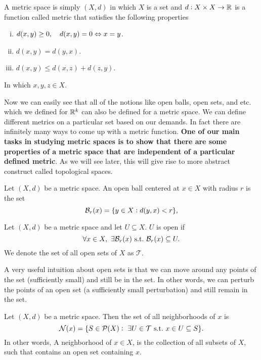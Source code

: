 \begin{definition}
	A metric space is simply $(X,d)$ in which $X$ is a  set and $d:X\times X \to \mathbb{R}$ is a function called metric that satisfies the following properties
	
	\begin{enumerate}[(i)]
		\item $d(x,y) \geq 0,\quad d(x,y) =0 \Leftrightarrow x=y$.
		\item $d(x,y) = d(y,x)$.
		\item $d(x,y) \leq d(x,z) + d(z,y)$.
	\end{enumerate}
	In which $x,y,z\in X$. 
\end{definition}
Now we can easily see that all of the notions like open balls, open sets, and etc. which we defined for $\mathbb{R}^k$ can also be defined for a metric space. We can define different metrics on a particular set based on our demands. In fact there are infinitely many ways to come up with a metric function. \textbf{One of our main tasks in studying metric spaces is to show that there are some properties of a metric space that are independent of a particular defined metric}. As we will see later, this will give rise to more abstract construct called topological spaces. 

\begin{definition}
	Let $(X,d)$ be a metric space. An open ball centered at $x\in X$ with radius $r$ is the set
	\[ \mathcal{B}_{r}(x) = \{ y\in X: d(y,x)<r \}, \]
\end{definition}


\begin{definition}
	Let $(X,d)$ be a metric space and let $U\subseteq X$. $U$ is open if 
	\[ \forall x\in X,\ \exists \mathcal{B}_{r}(x) \ \text{s.t.}\  \mathcal{B}_{r}(x) \subseteq U. \]
	We denote the set of all open sets of $X$ as $\mathcal{T}$.
\end{definition}

A very useful intuition about open sets is that we can move around any points of the set (sufficiently small) and still be in the set. In other words, we can perturb the points of an open set (a sufficiently small perturbation) and still remain in the set. 

\begin{definition}[Neighborhood of $x$]
	Let $(X,d)$ be a metric space. Then the set of all neighborhoods of $x$ is
	\[ \mathcal{N}(x) = \{ S \in \mathcal{P}(X):\ \exists U \in \mathcal{T} \ \text{s.t.}\  x\in U \subseteq S\}. \]
	In other words, A neighborhood of $x\in X$, is the collection of all subsets of $X$, such that contains an open set containing $x$.
\end{definition}

